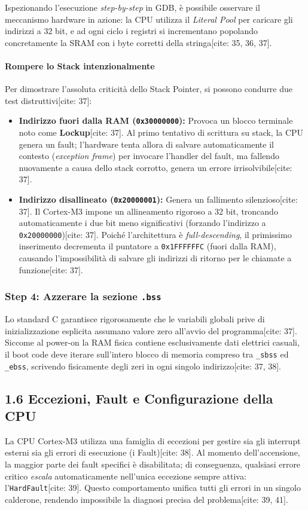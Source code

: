 Ispezionando l'esecuzione \textit{step-by-step} in GDB, è possibile osservare il meccanismo hardware in azione: la CPU utilizza il \textit{Literal Pool} per caricare gli indirizzi a 32 bit, e ad ogni ciclo i registri si incrementano popolando concretamente la SRAM con i byte corretti della stringa[cite: 35, 36, 37]. 

\paragraph*{Rompere lo Stack intenzionalmente} Per dimostrare l'assoluta criticità dello Stack Pointer, si possono condurre due test distruttivi[cite: 37]:
\begin{itemize}
    \item \textbf{Indirizzo fuori dalla RAM (\texttt{0x30000000}):} Provoca un blocco terminale noto come \textbf{Lockup}[cite: 37]. Al primo tentativo di scrittura su stack, la CPU genera un fault; l'hardware tenta allora di salvare automaticamente il contesto (\textit{exception frame}) per invocare l'handler del fault, ma fallendo nuovamente a causa dello stack corrotto, genera un errore irrisolvibile[cite: 37].
    \item \textbf{Indirizzo disallineato (\texttt{0x20000001}):} Genera un fallimento silenzioso[cite: 37]. Il Cortex-M3 impone un allineamento rigoroso a 32 bit, troncando automaticamente i due bit meno significativi (forzando l'indirizzo a \texttt{0x20000000})[cite: 37]. Poiché l'architettura è \textit{full-descending}, il primissimo inserimento decrementa il puntatore a \texttt{0x1FFFFFFC} (fuori dalla RAM), causando l'impossibilità di salvare gli indirizzi di ritorno per le chiamate a funzione[cite: 37].
\end{itemize}

\subsubsection*{Step 4: Azzerare la sezione \texttt{.bss}}
Lo standard C garantisce rigorosamente che le variabili globali prive di inizializzazione esplicita assumano valore zero all'avvio del programma[cite: 37]. Siccome al power-on la RAM fisica contiene esclusivamente dati elettrici casuali, il boot code deve iterare sull'intero blocco di memoria compreso tra \texttt{\_sbss} ed \texttt{\_ebss}, scrivendo fisicamente degli zeri in ogni singolo indirizzo[cite: 37, 38].



\subsection*{1.6 Eccezioni, Fault e Configurazione della CPU}
La CPU Cortex-M3 utilizza una famiglia di eccezioni per gestire sia gli interrupt esterni sia gli errori di esecuzione (i Fault)[cite: 38]. Al momento dell'accensione, la maggior parte dei fault specifici è disabilitata; di conseguenza, qualsiasi errore critico \textit{escala} automaticamente nell'unica eccezione sempre attiva: l'\texttt{HardFault}[cite: 39]. Questo comportamento unifica tutti gli errori in un singolo calderone, rendendo impossibile la diagnosi precisa del problema[cite: 39, 41].

